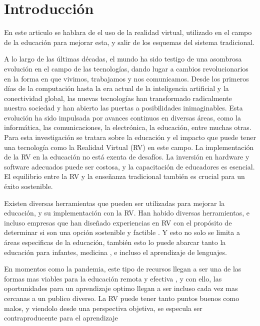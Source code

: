 \section{Introducción}

En este articulo se hablara de el uso de la realidad virtual, utilizado en el campo de la educación para mejorar esta, y salir de los esquemas del sistema tradicional.

A lo largo de las últimas décadas, el mundo ha sido testigo de una asombrosa evolución en el campo de las tecnologías, dando lugar a cambios revolucionarios en la forma en que vivimos, trabajamos y nos comunicamos. Desde los primeros días de la computación hasta la era actual de la inteligencia artificial y la conectividad global, las nuevas tecnologías han transformado radicalmente nuestra sociedad y han abierto las puertas a posibilidades inimaginables. Esta evolución ha sido impulsada por avances continuos en diversas áreas, como la informática, las comunicaciones, la electrónica, la educación, entre muchas otras. Para esta investigación se tratara sobre la educación y el impacto que puede tener una tecnología como la Realidad Virtual (RV) en este campo. La implementación de la RV en la educación no está exenta de desafíos. La inversión en hardware y software adecuados puede ser costosa, y la capacitación de educadores es esencial. El equilibrio entre la RV y la enseñanza tradicional también es crucial para un éxito sostenible.

Existen diversas herramientas que pueden ser utilizadas para mejorar la educación, y su implementación con la RV. Han habido diversas herramientas, e incluso empresas que han diseñado experiencias en RV con el propósito de determinar si son una opción sostenible y factible \parencite{SHIM2023100010}. Y esto no solo se limita a áreas especificas de la educación, también esto lo puede abarcar tanto la educación para infantes, medicina \parencite{GUERRERO2022100002}, e incluso el aprendizaje de lenguajes. \parencite{YUDINTSEVA2023100018, ZAMMIT2023100035}

En momentos como la pandemia, este tipo de recursos llegan a ser una de las formas mas viables para la educación remota y efectiva \parencite{GUERRERO2022100002}, y con ello, las oportunidades para un aprendizaje optimo llegan a ser incluso cada vez mas cercanas a un publico diverso. La RV puede tener tanto puntos buenos como malos, y viendolo desde una perspectiva objetiva, se especula ser contraproducente para el aprendizaje \parencite{OJE2023100033}

%

%
